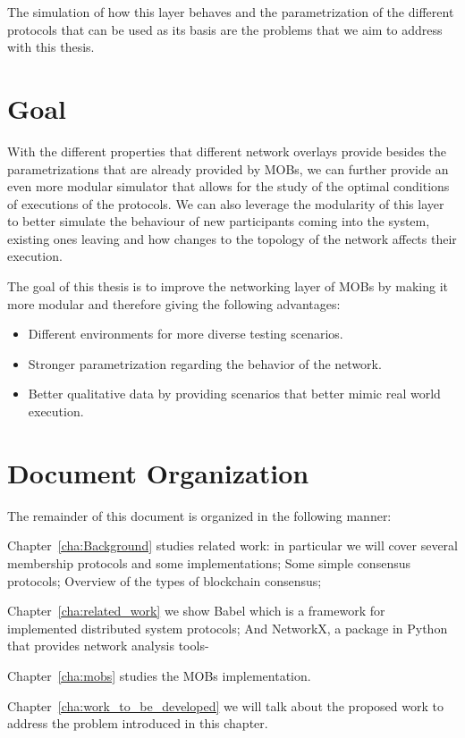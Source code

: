 The simulation of how this layer behaves and the parametrization of the different protocols that can be used as its basis are the
problems that we aim to address with this thesis.


\section{Goal}\label{sub:goal}

With the different properties that different network overlays provide besides the parametrizations that are already provided by MOBs,
we can further provide an even more modular simulator that allows for the study of the optimal conditions of executions of the protocols.
We can also leverage the modularity of this layer to better simulate the behaviour of new participants coming into the system, existing
ones leaving and how changes to the topology of the network affects their execution.

The goal of this thesis is to improve the networking layer of MOBs by making it more modular and therefore giving the following advantages:
\begin{itemize}
  \item Different environments for more diverse testing scenarios.
  \item Stronger parametrization regarding the behavior of the network.
  \item Better qualitative data by providing scenarios that better mimic real world execution.
\end{itemize}

\section{Document Organization}\label{sub:document_organization}

The remainder of this document is organized in the following manner:

Chapter~\ref{cha:Background} studies related work: in particular we will cover several membership protocols and some implementations;
Some simple consensus protocols; Overview of the types of blockchain consensus;


Chapter~\ref{cha:related_work} we show Babel which is a framework for implemented distributed system protocols; And NetworkX,
a package in Python that provides network analysis tools-

Chapter~\ref{cha:mobs} studies the MOBs implementation.

Chapter~\ref{cha:work_to_be_developed} we will talk about the proposed work to address the problem
introduced in this chapter.